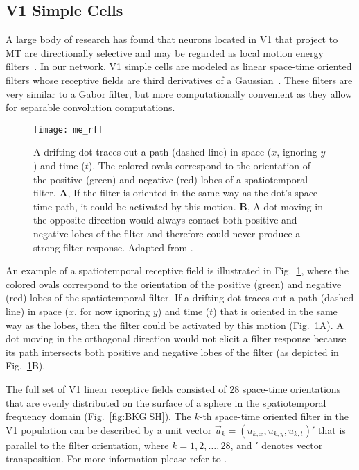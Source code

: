 \subsection{V1 Simple Cells}
\label{sec:ME|V1|simple}

A large body of research has found that
neurons located in V1 that project to MT are directionally
selective and may be regarded as local motion energy 
filters~\citep{AdelsonBergen1985,DeAngelis1993,MovshonNewsome1996}.
In our network, \ac{V1} simple cells are
modeled as linear space-time oriented filters whose receptive
fields are third derivatives of a Gaussian~\citep{SimoncelliHeeger1998}.
These filters are very similar to a Gabor filter,
but more computationally convenient as they allow for separable
convolution computations.

\begin{figure}[t]
  \centering
  \texttt{[image: me\_rf]}
  \caption{
  A drifting dot traces out a path (dashed line) in space
  ($x$, ignoring $y$) and time ($t$).
  The colored ovals correspond to the orientation of the positive
  (green) and negative (red) lobes of a spatiotemporal filter.
  \textbf{A}, If the filter is oriented in the same way as the
  dot's space-time path, it could be activated by this motion.
  \textbf{B}, A dot moving in the opposite direction would always
  contact both positive and negative lobes of the filter and
  therefore could never produce a strong filter response.
  Adapted from \cite{BradleyGoyal2008}.}
  \label{fig:ME|SH|RF}
\end{figure}

An example of a spatiotemporal receptive field is illustrated
in Fig.~\ref{fig:ME|SH|RF}, where the colored
ovals correspond to the orientation of the positive (green) and
negative (red) lobes of the spatiotemporal filter. If a drifting
dot traces out a path (dashed line) in space ($x$, for now ignoring
$y$) and time ($t$) that is oriented in the same way as the lobes,
then the filter could be activated by this motion
(Fig.~\ref{fig:ME|SH|RF}A).
A dot moving in the orthogonal direction would not elicit a filter
response because its path intersects both positive and negative
lobes of the filter (as depicted in Fig.~\ref{fig:ME|SH|RF}B).

The full set of \ac{V1} linear receptive fields consisted of $28$
space-time orientations that are evenly distributed on the
surface of a sphere in the spatiotemporal frequency domain
(Fig.~\ref{fig:BKG|SH}).
The $k$-th space-time oriented filter in the V1 population can be
described by a unit vector
$\vec{u}_k = (u_{k,x}, u_{k,y}, u_{k,t})'$
that is parallel
to the filter orientation, where $k=1, 2, \ldots, 28$, and $'$ denotes
vector transposition. For more information please refer to
\cite{SimoncelliHeeger1998}.

